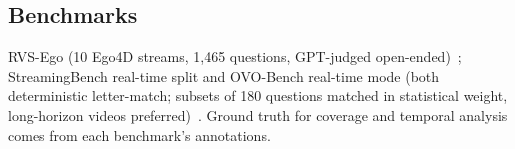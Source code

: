 \subsection{Benchmarks}
RVS-Ego (10 Ego4D streams, 1{,}465 questions, GPT-judged open-ended)~\cite{flashvstream,rekv}; StreamingBench real-time split and OVO-Bench real-time mode (both deterministic letter-match; subsets of 180 questions matched in statistical weight, long-horizon videos preferred)~\cite{streamingbench,ovobench}. Ground truth for coverage and temporal analysis comes from each benchmark's annotations.

